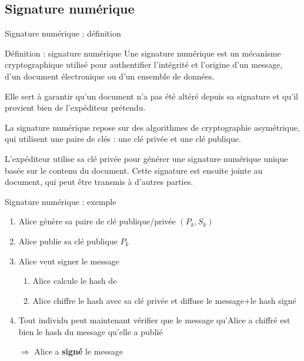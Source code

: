 \subsection{Signature numérique}

\begin{frame}{Signature numérique : définition}
  \begin{block}{Définition : signature numérique}
    Une signature numérique est un mécanisme cryptographique utilisé pour authentifier l'intégrité et l'origine d'un message, d'un document électronique ou d'un ensemble de données.

    Elle sert à garantir qu'un document n'a pas été altéré depuis sa signature et qu'il provient bien de l'expéditeur prétendu.

    La signature numérique repose sur des algorithmes de cryptographie asymétrique, qui utilisent une paire de clés : une clé privée et une clé publique.

    L'expéditeur utilise sa clé privée pour générer une signature numérique unique basée sur le contenu du document.
    Cette signature est ensuite jointe au document, qui peut être transmis à d'autres parties.
  \end{block}
\end{frame}

\begin{frame}{Signature numérique : exemple}
  \begin{enumerate}
    \item Alice génère sa paire de clé publique/privée $(P_k, S_k)$
    \item Alice publie sa clé publique $P_k$
    \item Alice veut signer le message 
          \begin{enumerate}
            \item Alice calcule le hash de 
            \item Alice chiffre le hash avec sa clé privée et diffuse le message+le hash signé
          \end{enumerate}
    \item Tout individu peut maintenant vérifier que le message qu'Alice a chiffré est bien le hash du message qu'elle a publié
    \item[$\Rightarrow$] Alice a \textbf{signé} le message 
  \end{enumerate}
\end{frame}

